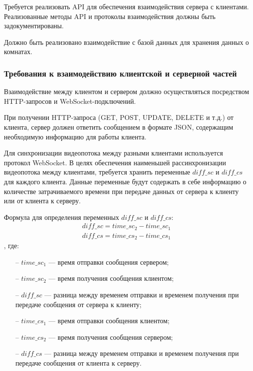 Требуется реализовать API для обеспечения взаимодействия сервера с клиентами.
Реализованные методы API и протоколы взаимодействия должны быть задокументированы.

Должно быть реализовано взаимодействие с базой данных для хранения данных о комнатах.

\newpage

\subsubsection{Требования к взаимодействию клиентской и серверной частей}
Взаимодействие между клиентом и сервером должно осуществляться посредством HTTP-запросов и WebSocket-подключений.

При получении HTTP-запроса (GET, POST, UPDATE, DELETE и т.д.) от клиента, сервер должен ответить сообщением в формате
JSON, содержащим необходимую информацию для работы клиента.

Для синхронизации видеопотока между разными клиентами используется протокол WebSocket.
В целях обеспечения наименьшей рассинхронизации видеопотока между клиентами, требуется хранить переменные \(diff\_sc\) и \(diff\_cs\) для
каждого клиента.
Данные переменные будут содержать в себе информацию о количестве затрачиваемого времени при передаче данных от сервера к клиенту или от клиента к серверу.

Формула для определения переменных \(diff\_sc\) и \(diff\_cs\): \begin{gather*}
                                                                    diff\_sc = time\_sc_2 - time\_sc_1\\
                                                                    diff\_cs = time\_cs_2 - time\_cs_1
\end{gather*}, где:
\begin{itemize}[noitemsep]
    \item[--] \(time\_sc_1\) — время отправки сообщения сервером;
    \item[--] \(time\_sc_2\) — время получения сообщения клиентом;
    \item[--] \(diff\_sc\) — разница между временем отправки и временем получения при передаче сообщения от сервера к клиенту;
    \item[--] \(time\_cs_1\) — время отправки сообщения клиентом;
    \item[--] \(time\_cs_2\) — время получения сообщения сервером;
    \item[--] \(diff\_cs\) — разница между временем отправки и временем получения при передаче сообщения от клиента к серверу.
\end{itemize}

